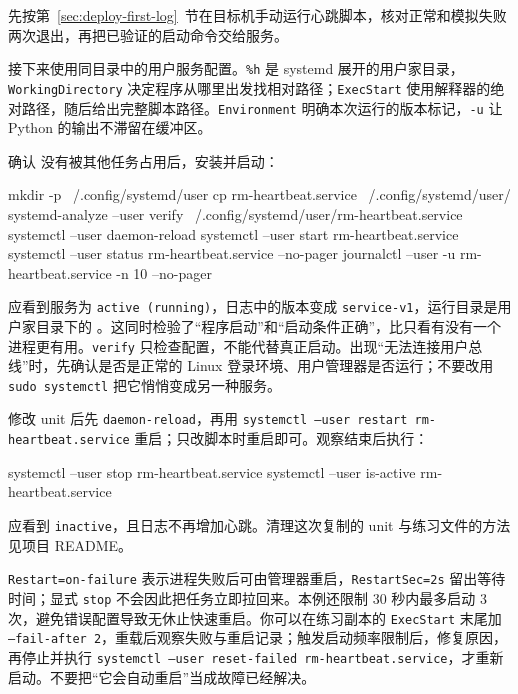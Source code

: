 \begin{example}
先按第~\ref{sec:deploy-first-log}~节在目标机手动运行心跳脚本，核对正常和模拟失败两次退出，再把已验证的启动命令交给服务。

接下来使用同目录中的用户服务配置。\texttt{\%h} 是 systemd 展开的用户家目录，\texttt{WorkingDirectory} 决定程序从哪里出发找相对路径；\texttt{ExecStart} 使用解释器的绝对路径，随后给出完整脚本路径。\texttt{Environment} 明确本次运行的版本标记，\texttt{-u} 让 Python 的输出不滞留在缓冲区。

确认  没有被其他任务占用后，安装并启动：
\begin{tbash}
mkdir -p ~/.config/systemd/user
cp rm-heartbeat.service ~/.config/systemd/user/
systemd-analyze --user verify ~/.config/systemd/user/rm-heartbeat.service
systemctl --user daemon-reload
systemctl --user start rm-heartbeat.service
systemctl --user status rm-heartbeat.service --no-pager
journalctl --user -u rm-heartbeat.service -n 10 --no-pager
\end{tbash}
应看到服务为 \texttt{active (running)}，日志中的版本变成 \texttt{service-v1}，运行目录是用户家目录下的 。这同时检验了“程序启动”和“启动条件正确”，比只看有没有一个进程更有用。\texttt{verify} 只检查配置，不能代替真正启动。出现“无法连接用户总线”时，先确认是否是正常的 Linux 登录环境、用户管理器是否运行；不要改用 \texttt{sudo systemctl} 把它悄悄变成另一种服务。

修改 unit 后先 \texttt{daemon-reload}，再用 \texttt{systemctl --user restart rm-heartbeat.service} 重启；只改脚本时重启即可。观察结束后执行：
\begin{tbash}
systemctl --user stop rm-heartbeat.service
systemctl --user is-active rm-heartbeat.service
\end{tbash}
应看到 \texttt{inactive}，且日志不再增加心跳。清理这次复制的 unit 与练习文件的方法见项目 README。
\end{example}

\texttt{Restart=on-failure} 表示进程失败后可由管理器重启，\texttt{RestartSec=2s} 留出等待时间；显式 \texttt{stop} 不会因此把任务立即拉回来。本例还限制 30 秒内最多启动 3 次，避免错误配置导致无休止快速重启。你可以在练习副本的 \texttt{ExecStart} 末尾加 \texttt{--fail-after 2}，重载后观察失败与重启记录；触发启动频率限制后，修复原因，再停止并执行 \texttt{systemctl --user reset-failed rm-heartbeat.service}，才重新启动。不要把“它会自动重启”当成故障已经解决。

